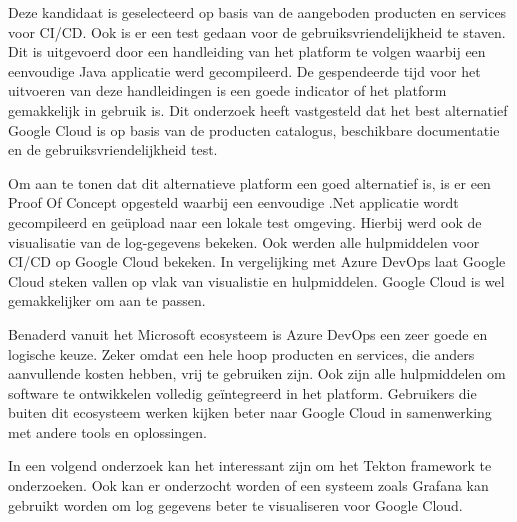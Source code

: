 Deze kandidaat is geselecteerd op basis van de aangeboden producten en services voor CI/CD. Ook is er een test gedaan voor de gebruiksvriendelijkheid te staven. Dit is uitgevoerd door een handleiding van het platform te volgen waarbij een eenvoudige Java applicatie werd gecompileerd. De gespendeerde tijd voor het uitvoeren van deze handleidingen is een goede indicator of het platform gemakkelijk in gebruik is. Dit onderzoek heeft vastgesteld dat het best alternatief Google Cloud is op basis van de producten catalogus, beschikbare documentatie en de gebruiksvriendelijkheid test. 

Om aan te tonen dat dit alternatieve platform een goed alternatief is, is er een Proof Of Concept opgesteld waarbij een eenvoudige .Net applicatie wordt gecompileerd en geüpload naar een lokale test omgeving. Hierbij werd ook de visualisatie van de log-gegevens bekeken. Ook werden alle hulpmiddelen voor CI/CD op Google Cloud bekeken. In vergelijking met Azure DevOps laat Google Cloud steken vallen op vlak van visualistie en hulpmiddelen. Google Cloud is wel gemakkelijker om aan te passen.

Benaderd vanuit het Microsoft ecosysteem is Azure DevOps een zeer goede en logische keuze. Zeker omdat een hele hoop producten en services, die anders aanvullende kosten hebben, vrij te gebruiken zijn. Ook zijn alle hulpmiddelen om software te ontwikkelen volledig geïntegreerd in het platform. Gebruikers die buiten dit ecosysteem werken kijken beter naar Google Cloud in samenwerking met andere tools en oplossingen.

In een volgend onderzoek kan het interessant zijn om het Tekton framework te onderzoeken. Ook kan er onderzocht worden of een systeem zoals Grafana kan gebruikt worden om log gegevens beter te visualiseren voor Google Cloud.
